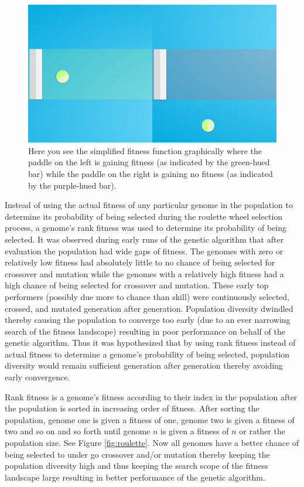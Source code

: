 \documentclass[a4paper,10pt]{article}
\begin{document}
\begin{figure}[H]  
  \centering
  \includegraphics[width=.45\textwidth]{figures/simple_fit_func.png}
  \caption{Here you see the simplified fitness function graphically where the paddle on the left is gaining fitness (as indicated by the green-hued bar) while the paddle on the right is gaining no fitness (as indicated by the purple-hued bar).}
  \label{fig:simple_fit_func}
\end{figure}

Instead of using the actual fitness of any particular genome in the population to determine its probability of being selected during the roulette wheel selection process, a genome's rank fitness was used to determine its probability of being selected. It was observed during early runs of the genetic algorithm that after evaluation the population had wide gaps of fitness. The genomes with zero or relatively low fitness had absolutely little to no chance of being selected for crossover and mutation while the genomes with a relatively high fitness had a high chance of being selected for crossover and mutation. These early top performers (possibly due more to chance than skill) were continuously selected, crossed, and mutated generation after generation. Population diversity dwindled thereby causing the population to converge too early (due to an ever narrowing search of the fitness landscape) resulting in poor performance on behalf of the genetic algorithm. Thus it was hypothesized that by using rank fitness instead of actual fitness to determine a genome's probability of being selected, population diversity would remain sufficient generation after generation thereby avoiding early convergence. 

Rank fitness is a genome's fitness according to their index in the population after the population is sorted in increasing order of fitness. After sorting the population, genome one is given a fitness of one, genome two is given a fitness of two and so on and so forth until genome $n$ is given a fitness of $n$ or rather the population size. See Figure \ref{fig:roulette}. Now all genomes have a better chance of being selected to under go crossover and/or mutation thereby keeping the population diversity high and thus keeping the search scope of the fitness landscape large resulting in better performance of the genetic algorithm.   
\end{document}
